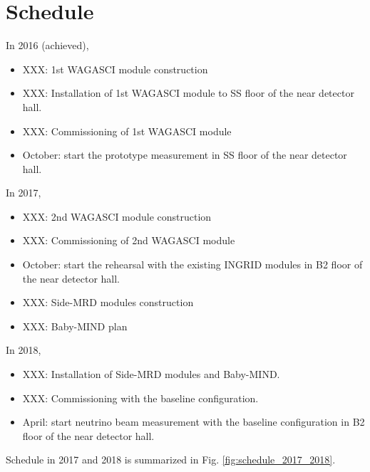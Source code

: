 \section{Schedule}
In 2016 (achieved),
\begin{itemize}
\item XXX: 1st WAGASCI module construction
\item XXX: Installation of 1st WAGASCI module to SS floor of the near detector hall.
\item XXX: Commissioning of 1st WAGASCI module
\item October: start the prototype measurement in SS floor of the near detector hall.
\end{itemize}
In 2017,
\begin{itemize}
\item XXX: 2nd WAGASCI module construction
\item XXX: Commissioning of 2nd WAGASCI module
\item October: start the rehearsal with the existing INGRID modules in B2 floor of the near detector hall.
\item XXX: Side-MRD modules construction
\item XXX: Baby-MIND plan
\end{itemize}
In 2018,
\begin{itemize}
\item XXX: Installation of Side-MRD modules and Baby-MIND.
\item XXX: Commissioning with the baseline configuration.
\item April: start neutrino beam measurement with the baseline configuration in B2 floor of the near detector hall.
\end{itemize}


Schedule in 2017 and 2018 is summarized in Fig. \ref{fig:schedule_2017_2018}.